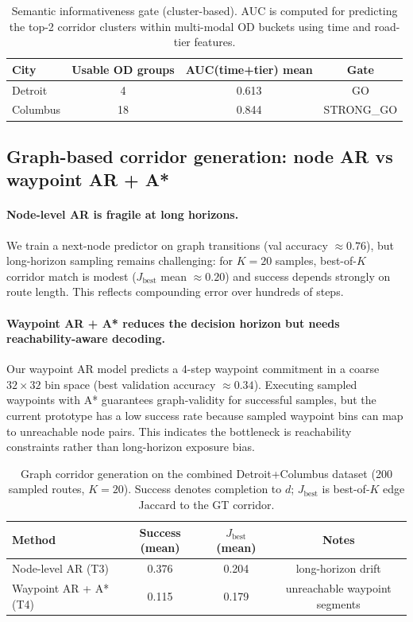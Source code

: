 \begin{table}[t]
  \centering
  \small
  \begin{tabular}{lccc}
    \toprule
    City & Usable OD groups & AUC(time+tier) mean & Gate \\
    \midrule
    Detroit & 4 & 0.613 & GO \\
    Columbus & 18 & 0.844 & STRONG\_GO \\
    \bottomrule
  \end{tabular}
  \caption{Semantic informativeness gate (cluster-based). AUC is computed for predicting the top-2 corridor clusters within multi-modal OD buckets using time and road-tier features.}
  \label{tab:semantic-gate}
\end{table}

\subsection{Graph-based corridor generation: node AR vs waypoint AR + A*}
\paragraph{Node-level AR is fragile at long horizons.}
We train a next-node predictor on graph transitions (val accuracy $\approx 0.76$), but long-horizon sampling remains challenging: for $K=20$ samples, best-of-$K$ corridor match is modest ($J_{\mathrm{best}}$ mean $\approx 0.20$) and success depends strongly on route length.
This reflects compounding error over hundreds of steps.

\paragraph{Waypoint AR + A* reduces the decision horizon but needs reachability-aware decoding.}
Our waypoint AR model predicts a 4-step waypoint commitment in a coarse $32\times 32$ bin space (best validation accuracy $\approx 0.34$).
Executing sampled waypoints with A* guarantees graph-validity for successful samples, but the current prototype has a low success rate because sampled waypoint bins can map to unreachable node pairs.
This indicates the bottleneck is reachability constraints rather than long-horizon exposure bias.

\begin{table}[t]
  \centering
  \small
  \begin{tabular}{lccc}
    \toprule
    Method & Success (mean) & $J_{\mathrm{best}}$ (mean) & Notes \\
    \midrule
    Node-level AR (T3) & 0.376 & 0.204 & long-horizon drift \\
    Waypoint AR + A* (T4) & 0.115 & 0.179 & unreachable waypoint segments \\
    \bottomrule
  \end{tabular}
  \caption{Graph corridor generation on the combined Detroit+Columbus dataset (200 sampled routes, $K=20$). Success denotes completion to $d$; $J_{\mathrm{best}}$ is best-of-$K$ edge Jaccard to the GT corridor.}
  \label{tab:t3-t4}
\end{table}
